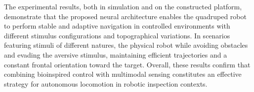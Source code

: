 %

The experimental results, both in simulation and on the constructed platform, demonstrate that the proposed neural architecture enables the quadruped robot to perform stable and adaptive navigation in controlled environments with different stimulus configurations and topographical variations. In scenarios featuring stimuli of different natures, the physical robot  while avoiding obstacles and evading the aversive stimulus, maintaining efficient trajectories and a constant frontal orientation toward the target. Overall, these results confirm that combining bioinspired control with multimodal sensing constitutes an effective strategy for autonomous locomotion in robotic inspection contexts.
